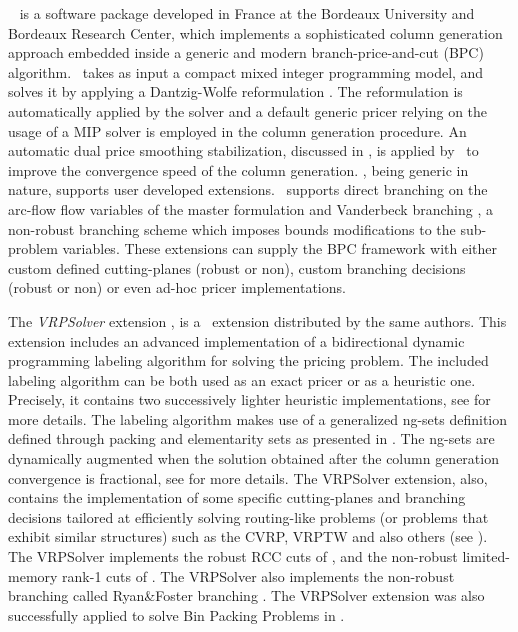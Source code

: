 \textit{\bapcod}\ \parencite{sadykov2021} is a software package
developed in France at the Bordeaux University and Bordeaux Research Center,
which implements a sophisticated column generation approach
embedded inside a generic and modern branch-price-and-cut (BPC) algorithm.
\bapcod\ takes as input a compact mixed integer programming model,
and solves it by applying a Dantzig-Wolfe reformulation \parencite{dantzig1960}.
The reformulation is automatically applied by the solver
and a default generic pricer relying on
the usage of a MIP solver is employed in the column generation procedure.
An automatic dual price smoothing stabilization, discussed in \textcite{pessoa2018automation},
is applied by \bapcod\ to improve the convergence speed of the column generation.
\bapcod, being generic in nature,
supports user developed extensions.
\bapcod\ supports direct branching on the arc-flow flow variables of the master formulation
and Vanderbeck branching \parencite{vanderbeck2011}, a non-robust branching
scheme which imposes bounds modifications to the sub-problem variables.
These extensions can supply the BPC framework with either
custom defined cutting-planes (robust or non), custom branching decisions (robust or non)
or even ad-hoc pricer implementations.

The \textit{VRPSolver} extension \parencite{pessoa2020generic}, is
a \bapcod\ extension distributed by the same authors.
This extension includes an
advanced implementation of a bidirectional dynamic programming labeling algorithm
\parencite{sadykov2021bucket} for solving the pricing problem.
The included labeling algorithm
can be both used as an exact pricer or as a heuristic one.
Precisely, it contains two successively lighter heuristic implementations,
see \textcite{sadykov2021bucket} for more details.
The labeling algorithm makes use of a generalized ng-sets definition \parencite{baldacci2011}
defined through packing and elementarity sets as presented in \textcite{pessoa2020generic}.
The ng-sets are dynamically augmented \parencite{roberti2014}
when the solution obtained after the column generation convergence
is fractional,
see \textcite{pessoa2020generic} for more details.
The VRPSolver extension, also,
contains the implementation of some
specific cutting-planes and branching decisions
tailored at efficiently solving routing-like problems
(or problems that exhibit similar structures)
such as the CVRP, VRPTW and also others (see \cite{pessoa2020generic}).
The VRPSolver implements the robust RCC cuts of \textcite{laporte1983},
and the non-robust limited-memory rank-1 cuts of \textcite{pecin2017improved}.
The VRPSolver also implements the non-robust branching called Ryan\&Foster branching \parencite{ryan1981integer}.
The VRPSolver extension was also successfully applied
to solve Bin Packing Problems in \textcite{pessoa2020}.

